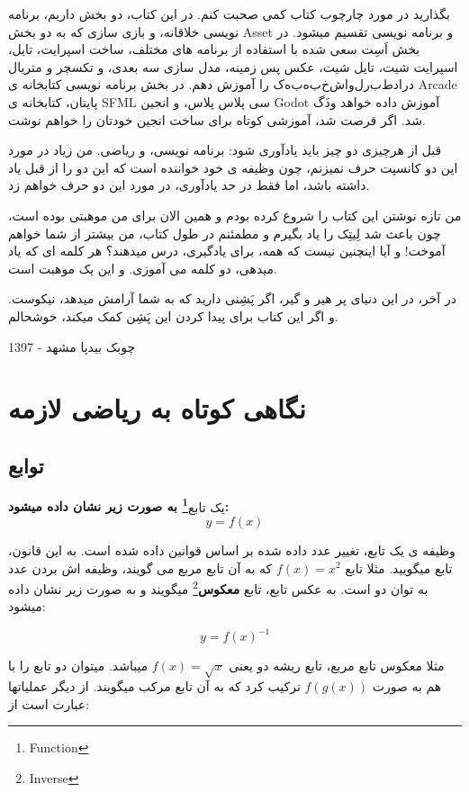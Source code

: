 \documentclass[14pt,a4paper]{memoir}
\begin{document}
	بگذارید در مورد چارچوب کتاب کمی صحبت کنم. در این کتاب، دو بخش داریم، برنامه نویسی خلاقانه، و بازی سازی که به دو بخش Asset و برنامه نویسی تقسیم میشود. در بخش اَسِت سعی شده با استفاده از برنامه های مختلف، ساخت اسپرایت، تایل، اسپرایت شیت، تایل شیت، عکس پس زمینه، مدل سازی سه بعدی، و تکسچر و متریال \(که به بخش اول ربط دارد\) را آموزش دهم. در بخش برنامه نویسی کتابخانه ی Arcade پایتان، کتابخانه ی SFML سی پلاس پلاس، و انجین Godot \(گَدو\) آموزش داده خواهد شد. اگر قرصت شد، آموزشی کوتاه برای ساخت انجین خودتان را خواهم نوشت.
	
	قبل از هرچیزی دو چیز باید یادآوری شود: برنامه نویسی، و ریاضی. من زیاد در مورد این دو کانسپت حرف نمیزنم، چون وظیفه ی خود خواننده است که این دو را از قبل یاد داشته باشد، اما فقط در حد یادآوری، در مورد این دو حرف خواهم زد.
	 
	 من تازه نوشتن این کتاب را شروع کرده بودم و همین الان برای من موهبتی بوده است، چون باعث شد لِیتِک را یاد بگیرم و مطمئنم در طول کتاب، من بیشتر از شما خواهم آموخت! و آیا اینچنین نیست که همه، برای یادگیری، درس میدهند؟ هر کلمه ای که یاد میدهی، دو کلمه می آموزی. و این یک موهبت است.
	 
	 
	 در آخر، در این دنیای پر هیر و گیر، اگر پَشِنی دارید که به شما آرامش میدهد، نیکوست. و اگر این کتاب برای پیدا کردن این پَشِن کمک میکند، خوشحالم.
	 
	 \begin{flushleft}
	 	چوبک بیدپا
	 	مشهد - 1397
	 \end{flushleft}
	 
	 
	 
	 \chapter{نگاهی کوتاه به ریاضی لازمه}\label{math}
	 \section{توابع}\label{functions}

یک تابع\textbf{\footnote{Function} به صورت زیر نشان داده میشود:
\[y = f(x)\]}

وظیفه ی یک تابع، تغییر عدد داده شده بر اساس قوانین داده شده است. به این قانون، تابع میگویید. مثلا تابع \(f(x) = x^2\) که به آن تابع مربع می گویند، وظیفه اش بردن عدد به توان دو است. به عکس تابع، تابع \textbf{معکوس}\footnote{Inverse} میگویند و به صورت زیر نشان داده میشود:

\[y = f(x)^{-1}\]

مثلا معکوس تابع مربع، تابع ریشه دو یعنی $ f(x) = \sqrt{x} $ میباشد. میتوان دو تابع را با هم به صورت $ f(g(x)) $ ترکیب کرد که به آن تابع مرکب میگویند. از دیگر عملیاتها عبارت است از:
\end{document}
